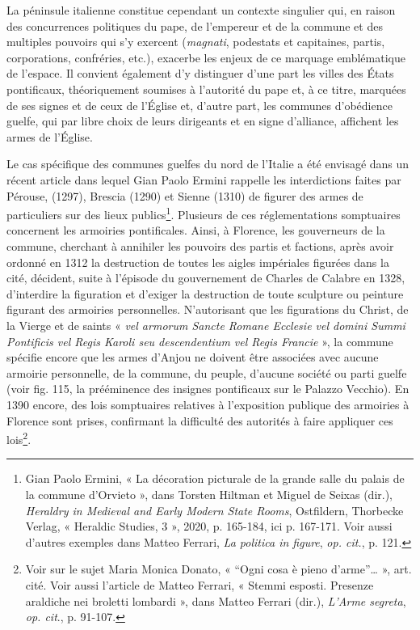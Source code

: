 \documentclass[12pt,twoside,openany]{book}
\begin{document}
La péninsule italienne constitue cependant un contexte singulier qui, en raison des concurrences politiques du pape, de l’empereur et de la commune et des multiples pouvoirs qui s’y exercent (\textit{magnati}, podestats et capitaines, partis, corporations, confréries, etc.), exacerbe les enjeux de ce marquage emblématique de l’espace. Il convient également d’y distinguer d’une part les villes des États pontificaux, théoriquement soumises à l’autorité du pape et, à ce titre, marquées de ses signes et de ceux de l’Église et, d’autre part, les communes d’obédience guelfe, qui par libre choix de leurs dirigeants et en signe d’alliance, affichent les armes de l’Église.

Le cas spécifique des communes guelfes du nord de l’Italie a été envisagé dans un récent article dans lequel Gian Paolo Ermini rappelle les interdictions faites par Pérouse, (1297), Brescia (1290) et Sienne (1310) de figurer des armes de particuliers sur des lieux publics\footnote{Gian Paolo Ermini, « La décoration picturale de la grande salle du palais de la commune d’Orvieto », dans Torsten Hiltman et Miguel de Seixas (dir.), \textit{Heraldry in Medieval and Early Modern State Rooms}, Ostfildern, Thorbecke Verlag, « Heraldic Studies, 3 », 2020, p. 165-184, ici p. 167-171. Voir aussi d’autres exemples dans Matteo Ferrari, \textit{La politica in figure}, \textit{op. cit.}, p. 121.}. Plusieurs de ces réglementations somptuaires concernent les armoiries pontificales. Ainsi, à Florence, les gouverneurs de la commune, cherchant à annihiler les pouvoirs des partis et factions, après avoir ordonné en 1312 la destruction de toutes les aigles impériales figurées dans la cité, décident, suite à l’épisode du gouvernement de Charles de Calabre en 1328, d’interdire la figuration et d’exiger la destruction de toute sculpture ou peinture figurant des armoiries personnelles. N’autorisant que les figurations du Christ, de la Vierge et de saints « \textit{vel armorum Sancte Romane Ecclesie vel domini Summi Pontificis vel Regis Karoli seu descendentium vel Regis Francie} », la commune spécifie encore que les armes d’Anjou ne doivent être associées avec aucune armoirie personnelle, de la commune, du peuple, d’aucune société ou parti guelfe (voir fig. 115, la prééminence des insignes pontificaux sur le Palazzo Vecchio). En 1390 encore, des lois somptuaires relatives à l’exposition publique des armoiries à Florence sont prises, confirmant la difficulté des autorités à faire appliquer ces lois\footnote{Voir sur le sujet Maria Monica Donato, « “Ogni cosa è pieno d’arme”… », art. cité. Voir aussi l’article de Matteo Ferrari, « Stemmi esposti. Presenze araldiche nei broletti lombardi », dans Matteo Ferrari (dir.), \textit{L’Arme segreta}, \textit{op. cit}., p. 91-107.}.
\end{document}
